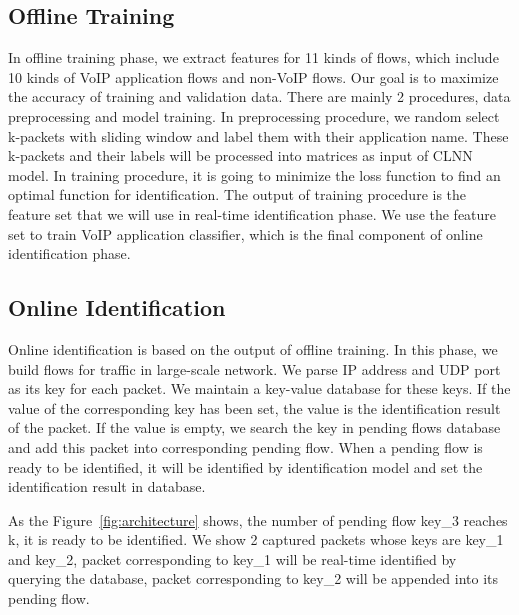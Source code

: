 \documentclass[conference]{IEEEtran}
\begin{document}
\subsection{Offline Training}
In offline training phase, we extract features for 11 kinds of flows, which include 10 kinds of VoIP application flows and non-VoIP flows. Our goal is to maximize the accuracy of training and validation data. There are mainly 2 procedures, data preprocessing and model training. In preprocessing procedure, we random select k-packets with sliding window and label them with their application name. These k-packets and their labels will be processed into matrices as input of CLNN model. In training procedure, it is going to minimize the loss function to find an optimal function for identification. The output of training procedure is the feature set that we will use in real-time identification phase. We use the feature set to train VoIP application classifier, which is the final component of online identification phase.


\subsection{Online Identification}
Online identification is based on the output of offline training. In this phase, we build flows for traffic in large-scale network. We parse IP address and UDP port as its key for each packet. We maintain a key-value database for these keys. If the value of the corresponding key has been set, the value is the identification result of the packet. If the value is empty, we search the key in pending flows database and add this packet into corresponding pending flow. When a pending flow is ready to be identified, it will be identified by identification model and set the identification result in database.  %

As the Figure~\ref{fig:architecture} shows, the number of pending flow key\_3 reaches k, it is ready to be identified. We show 2 captured packets whose keys are key\_1 and key\_2, packet corresponding to key\_1 will be real-time identified by querying the database, packet corresponding to key\_2 will be appended into its pending flow.
\end{document}
